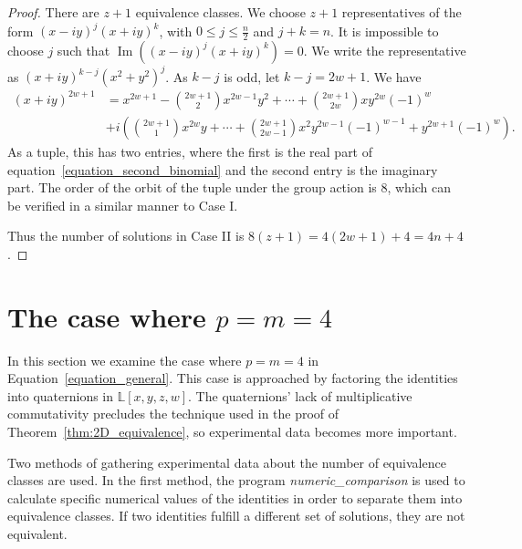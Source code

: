 \documentclass[12pt,table]{article}
\theoremstyle{definition}
\theoremstyle{remark}
\newcommand{\Lll}{\mathbb L}
\numberwithin{equation}{section}
\DeclareMathOperator{\Imag}{Im}
\begin{document}
\begin{proof}
There are $ z + 1 $ equivalence classes. We choose $ z + 1 $
representatives of the form $ (x - iy)^j (x + iy)^k $, with
$ 0 \leq j \leq \frac{n}{2}$ and $ j + k = n $.
It is impossible to
choose $ j $ such that $ \Imag\left( (x - iy)^j (x + iy)^k \right) = 0$.
We write the representative as $ (x + iy)^{k-j} (x^2 + y^2)^j $.
As $ k - j $ is odd, let $ k - j = 2w + 1 $. We have
\begin{align}
\label{equation_second_binomial}
(x + iy) ^ {2w + 1} &= x ^ {2w + 1} - \binom{2w+1}{2}  x^{2w - 1 } y^2
+ \cdots + \binom{2w+1}{2w} x y^{2w} (-1) ^ {w} \nonumber
\\
&+ i \left( \binom{2w+1}{1} x ^ {2w} y + \cdots +
\binom{2w+1}{2w-1}  x^2 y ^ {2w -1} (-1)^{w-1}
+  y^{2w+1} (-1) ^ {w}
\right).
\end{align}
As a tuple, this has two entries, where the first is the real part
of equation~\ref{equation_second_binomial} and the second entry
is the imaginary part.
The order of the orbit of the tuple under the group action is 8, which can be
verified in a similar manner to Case I.

Thus the number of solutions in Case II is $ 8(z + 1) = 4 ( 2w + 1) + 4 = 4n + 4 $.
\end{proof}




\section{The case where $p = m = 4$}
\label{sec:4D}

In this section we examine the case where
$p = m = 4$ in Equation~\ref{equation_general}.
This case is approached by factoring the identities
into quaternions in $\Lll[x,y,z,w]$. The quaternions'
lack of multiplicative commutativity precludes the 
technique used in the proof of Theorem~\ref{thm:2D_equivalence},
so experimental data becomes more important.


Two methods of gathering experimental data about the 
number of equivalence classes are used. 
In the first method,
the program \emph{numeric\_comparison}
is used to calculate specific numerical values of 
the identities in order to 
separate them into equivalence classes.
If two identities fulfill
a different set of solutions, they are
not equivalent.
\end{document}
